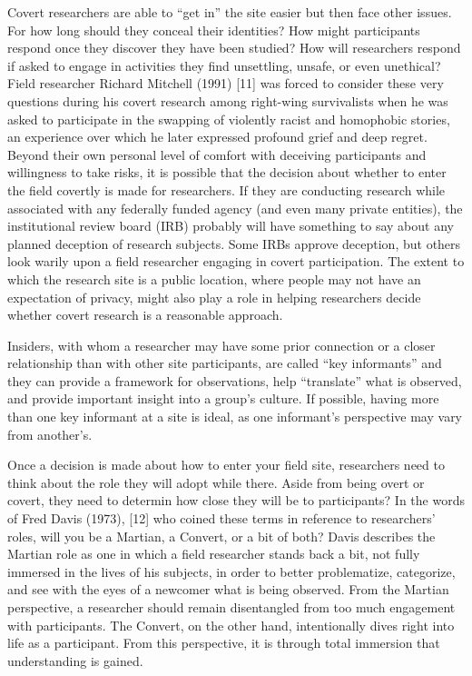 Covert researchers are able to ``get in'' the site easier but then face other issues. For how long should they conceal their identities? How might participants respond once they discover they have been studied? How will researchers respond if asked to engage in activities they find unsettling, unsafe, or even unethical? Field researcher Richard Mitchell (1991) [11] was forced to consider these very questions during his covert research among right-wing survivalists when he was asked to participate in the swapping of violently racist and homophobic stories, an experience over which he later expressed profound grief and deep regret. Beyond their own personal level of comfort with deceiving participants and willingness to take risks, it is possible that the decision about whether to enter the field covertly is made for researchers. If they are conducting research while associated with any federally funded agency (and even many private entities), the institutional review board (IRB) probably will have something to say about any planned deception of research subjects. Some IRBs approve deception, but others look warily upon a field researcher engaging in covert participation. The extent to which the research site is a public location, where people may not have an expectation of privacy, might also play a role in helping researchers decide whether covert research is a reasonable approach.

Insiders, with whom a researcher may have some prior connection or a closer relationship than with other site participants, are called ``key informants'' and they can provide a framework for observations, help ``translate'' what is observed, and provide important insight into a group’s culture. If possible, having more than one key informant at a site is ideal, as one informant’s perspective may vary from another’s.

Once a decision is made about how to enter your field site, researchers need to think about the role they will adopt while there. Aside from being overt or covert, they need to determin how close they will be to participants? In the words of Fred Davis (1973), [12] who coined these terms in reference to researchers’ roles, will you be a Martian, a Convert, or a bit of both? Davis describes the Martian role as one in which a field researcher stands back a bit, not fully immersed in the lives of his subjects, in order to better problematize, categorize, and see with the eyes of a newcomer what is being observed. From the Martian perspective, a researcher should remain disentangled from too much engagement with participants. The Convert, on the other hand, intentionally dives right into life as a participant. From this perspective, it is through total immersion that understanding is gained. 

